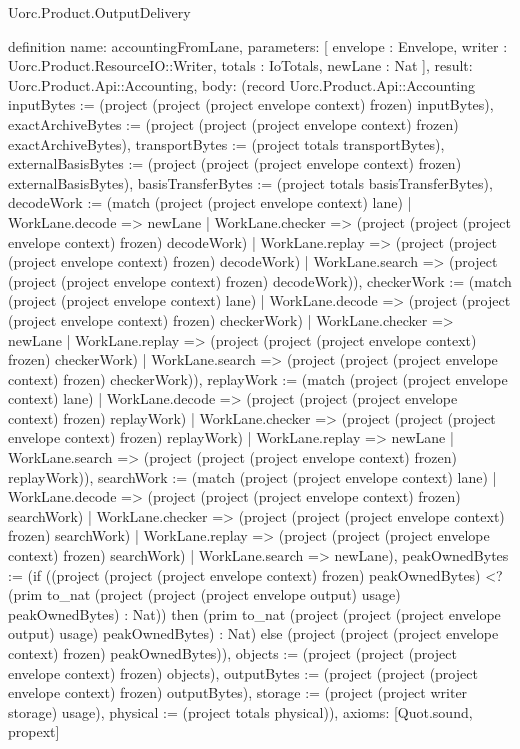 \begin{lexlean}{Uorc.Product.OutputDelivery}
\begin{semanticmodule}
definition{
  name: accountingFromLane,
  parameters: [
    envelope : Envelope,
    writer : Uorc.Product.ResourceIO::Writer,
    totals : IoTotals,
    newLane : Nat
  ],
  result: Uorc.Product.Api::Accounting,
  body: (record Uorc.Product.Api::Accounting {inputBytes := (project (project (project envelope context) frozen) inputBytes), exactArchiveBytes := (project (project (project envelope context) frozen) exactArchiveBytes), transportBytes := (project totals transportBytes), externalBasisBytes := (project (project (project envelope context) frozen) externalBasisBytes), basisTransferBytes := (project totals basisTransferBytes), decodeWork := (match (project (project envelope context) lane)
    | WorkLane.decode => newLane
    | WorkLane.checker => (project (project (project envelope context) frozen) decodeWork)
    | WorkLane.replay => (project (project (project envelope context) frozen) decodeWork)
    | WorkLane.search => (project (project (project envelope context) frozen) decodeWork)), checkerWork := (match (project (project envelope context) lane)
    | WorkLane.decode => (project (project (project envelope context) frozen) checkerWork)
    | WorkLane.checker => newLane
    | WorkLane.replay => (project (project (project envelope context) frozen) checkerWork)
    | WorkLane.search => (project (project (project envelope context) frozen) checkerWork)), replayWork := (match (project (project envelope context) lane)
    | WorkLane.decode => (project (project (project envelope context) frozen) replayWork)
    | WorkLane.checker => (project (project (project envelope context) frozen) replayWork)
    | WorkLane.replay => newLane
    | WorkLane.search => (project (project (project envelope context) frozen) replayWork)), searchWork := (match (project (project envelope context) lane)
    | WorkLane.decode => (project (project (project envelope context) frozen) searchWork)
    | WorkLane.checker => (project (project (project envelope context) frozen) searchWork)
    | WorkLane.replay => (project (project (project envelope context) frozen) searchWork)
    | WorkLane.search => newLane), peakOwnedBytes := (if ((project (project (project envelope context) frozen) peakOwnedBytes) <? (prim to_nat (project (project (project envelope output) usage) peakOwnedBytes) : Nat)) then (prim to_nat (project (project (project envelope output) usage) peakOwnedBytes) : Nat) else (project (project (project envelope context) frozen) peakOwnedBytes)), objects := (project (project (project envelope context) frozen) objects), outputBytes := (project (project (project envelope context) frozen) outputBytes), storage := (project (project writer storage) usage), physical := (project totals physical)}),
  axioms: [Quot.sound, propext]
}


\end{semanticmodule}
\end{lexlean}
